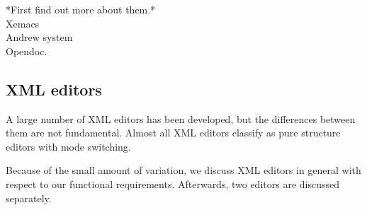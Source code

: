 \bc
\toHere     %


*First find out more about them.*\\
Xemacs\\
Andrew system\\
Opendoc.\\

\fromHere  %


\ec

%																
\subsection{XML editors} \label{sect:xmlEditors}

A large number of XML editors has been developed, but the differences between them are not fundamental. Almost all XML editors classify as pure structure editors with mode switching. 

Because of the small amount of variation, we discuss XML editors in general with respect to our functional requirements. Afterwards, two  editors are discussed separately.

